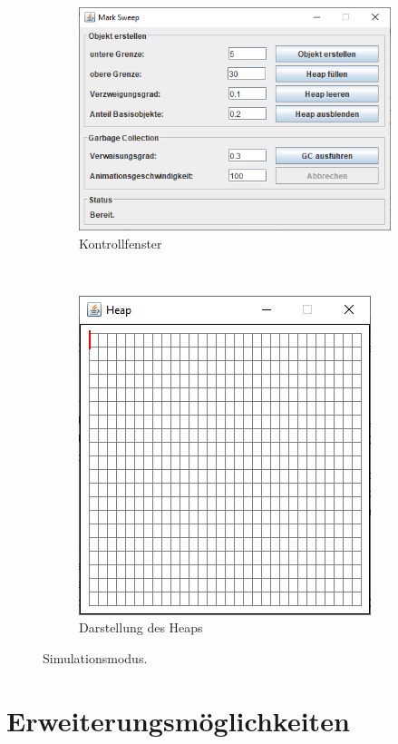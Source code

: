 \begin{figure}[h]
	\centering
	\begin{subfigure}[t]{0.6\textwidth}
		\centering
		\includegraphics[scale=0.5]{img/gui/simulation-control.png}
		\caption{Kontrollfenster}
	\end{subfigure}~\hspace{0.25cm}~
	\begin{subfigure}[t]{0.35\textwidth}
		\centering
		\includegraphics[scale=0.5]{img/gui/simulation-canvas.png}
		\caption{Darstellung des Heaps}
	\end{subfigure}
	\caption[Simulationsmodus]{Simulationsmodus.}
	\label{fig:app-simulation}
\end{figure}



\section{Erweiterungsmöglichkeiten}
\label{sec:extension}